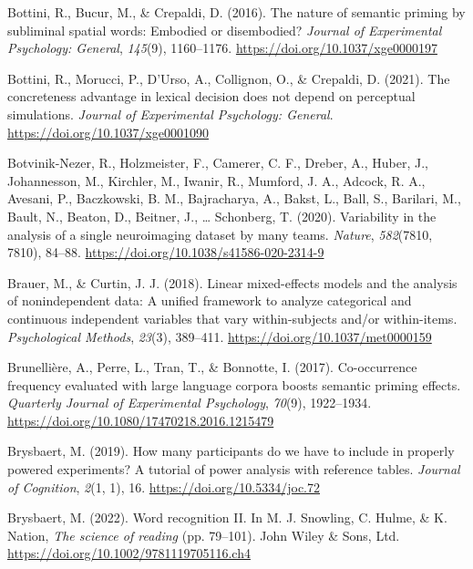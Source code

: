 \documentclass[
  12pt,
  man,floatsintext]{apa7}
\newlength{\cslhangindent}
\newlength{\cslentryspacingunit} %
\newenvironment{CSLReferences}[2] %
 {%
  \setlength{\parindent}{0pt}
  \ifodd #1
  \let\oldpar\par
  \def\par{\hangindent=\cslhangindent\oldpar}
  \fi
  \setlength{\parskip}{#2\cslentryspacingunit}
 }%
 {}
\begin{document}
\begin{CSLReferences}{1}{0}
\leavevmode{}%
Bottini, R., Bucur, M., \& Crepaldi, D. (2016). The nature of semantic priming by subliminal spatial words: {Embodied} or disembodied? \emph{Journal of Experimental Psychology: General}, \emph{145}(9), 1160--1176. \url{https://doi.org/10.1037/xge0000197}

\leavevmode{}%
Bottini, R., Morucci, P., D'Urso, A., Collignon, O., \& Crepaldi, D. (2021). The concreteness advantage in lexical decision does not depend on perceptual simulations. \emph{Journal of Experimental Psychology: General}. \url{https://doi.org/10.1037/xge0001090}

\leavevmode{}%
Botvinik-Nezer, R., Holzmeister, F., Camerer, C. F., Dreber, A., Huber, J., Johannesson, M., Kirchler, M., Iwanir, R., Mumford, J. A., Adcock, R. A., Avesani, P., Baczkowski, B. M., Bajracharya, A., Bakst, L., Ball, S., Barilari, M., Bault, N., Beaton, D., Beitner, J., \ldots{} Schonberg, T. (2020). Variability in the analysis of a single neuroimaging dataset by many teams. \emph{Nature}, \emph{582}(7810, 7810), 84--88. \url{https://doi.org/10.1038/s41586-020-2314-9}

\leavevmode{}%
Brauer, M., \& Curtin, J. J. (2018). Linear mixed-effects models and the analysis of nonindependent data: {A} unified framework to analyze categorical and continuous independent variables that vary within-subjects and/or within-items. \emph{Psychological Methods}, \emph{23}(3), 389--411. \url{https://doi.org/10.1037/met0000159}

\leavevmode{}%
Brunellière, A., Perre, L., Tran, T., \& Bonnotte, I. (2017). Co-occurrence frequency evaluated with large language corpora boosts semantic priming effects. \emph{Quarterly Journal of Experimental Psychology}, \emph{70}(9), 1922--1934. \url{https://doi.org/10.1080/17470218.2016.1215479}

\leavevmode{}%
Brysbaert, M. (2019). How many participants do we have to include in properly powered experiments? {A} tutorial of power analysis with reference tables. \emph{Journal of Cognition}, \emph{2}(1, 1), 16. \url{https://doi.org/10.5334/joc.72}

\leavevmode{}%
Brysbaert, M. (2022). Word recognition {II}. In M. J. Snowling, C. Hulme, \& K. Nation, \emph{The science of reading} (pp. 79--101). {John Wiley \& Sons, Ltd}. \url{https://doi.org/10.1002/9781119705116.ch4}


\end{CSLReferences}
\end{document}
